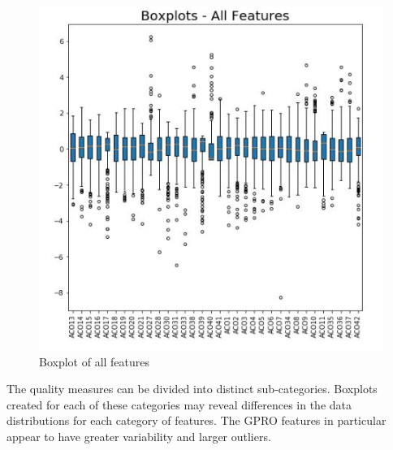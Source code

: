 \documentclass[conference]{IEEEtran}
\begin{document}
\begin{figure}[H]
    \centering
    \includegraphics{BoxPlots_ALL.jpg}
    \caption{Boxplot of all features}
    \label{fig:boxall}
\end{figure}

The quality measures can be divided into distinct sub-categories. Boxplots created for each of these categories may reveal differences in the data distributions for each category of features. The GPRO features in particular appear to have greater variability and larger outliers.
\end{document}
